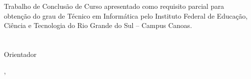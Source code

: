 %
%

\begin{folhaderosto}
	
    \begin{center}
    
    	\vspace*{3cm}%
		\small\expandafter\expandafter{\imprimirnomeautor}\\
		\vspace*{3cm}%
		\normalsize\textbf{\expandafter\expandafter{\imprimirtitulotb}}\\
		
    \end{center}

    \vspace*{2cm}%
	
	\vspace*{0.35 cm}%
		    \large%
    		\hfill%
	    	\begin{minipage}{8 cm}%
	    		\begin{small} %
	    		\setlength{\baselineskip}{0.7\baselineskip}
				
		    	{Trabalho de Conclusão de Curso
apresentado como requisito parcial para
obtenção do grau de Técnico em
Informática pelo Instituto Federal de
Educação, Ciência e Tecnologia do Rio
Grande do Sul – Campus Canoas.}\\{ \vspace*{5cm}%
		    	}\\{\imprimirtitulacaoorientador }{ }{\imprimirorientador}\\Orientador 
				
				
				\end{small} %
		    \end{minipage}%
		    	
		    \vspace*{3 cm}%
		    
		    \begin{center} %
		    	\normalsize %
	    		\imprimirlocal, 
	    		\imprimirdata
	    	\end{center}%

\end{folhaderosto}
